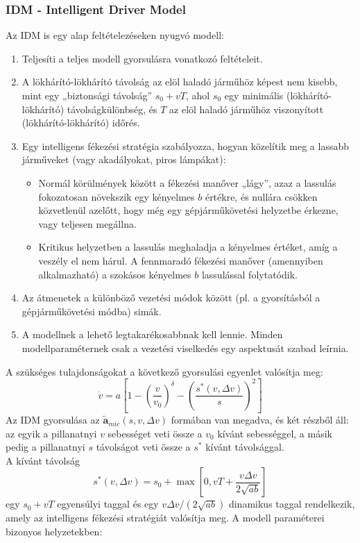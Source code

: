 \documentclass[14pt,a4paper]{extarticle}
\begin{document}
\subsubsection{IDM - Intelligent Driver Model}
Az IDM is egy alap feltételezéseken nyugvó modell:
\begin{enumerate}
	\item Teljesíti a teljes modell gyorsulásra vonatkozó feltételeit.
	\item A lökhárító-lökhárító távolság az elöl haladó járműhöz képest nem kisebb, mint egy „biztonsági távolság” $s_0 + vT$, ahol $s_0$ egy minimális (lökhárító-lökhárító) távolságkülönbség, és $T$ az elöl haladó járműhöz viszonyított (lökhárító-lökhárító) időrés.
	\item Egy intelligens fékezési stratégia szabályozza, hogyan közelítik meg a lassabb járműveket (vagy akadályokat, piros lámpákat):
	\begin{itemize}
		\item	Normál körülmények között a fékezési manőver „lágy”, azaz a lassulás fokozatosan növekszik egy kényelmes $b$ értékre, és nullára csökken közvetlenül azelőtt, hogy még egy  gépjárműkövetési helyzetbe érkezne, vagy teljesen megállna.
		\item Kritikus helyzetben a lassulás meghaladja a kényelmes értéket, amíg a veszély el nem hárul. A fennmaradó fékezési manőver (amennyiben alkalmazható) a szokásos kényelmes $b$ lassulással folytatódik.
	\end{itemize}
	\item Az átmenetek a különböző vezetési módok között (pl. a gyorsításból a gépjárműkövetési módba) simák.
	\item A modellnek a lehető legtakarékosabbnak kell lennie. Minden modellparaméternek csak a vezetési viselkedés egy aspektusát szabad leírnia.
\end{enumerate}
A szükséges tulajdonságokat a következő gyorsulási egyenlet valósítja meg:$$\dot{v} = a \left[1 - \left(\frac{v}{v_0}\right)^\delta - \left(\frac{s^*(v, \Delta v)}{s}\right)^2 \right]$$
Az IDM gyorsulása az $\mathbf{\tilde{a}}_{mic}(s, v, \Delta v)$ formában van megadva, és két részből áll: az egyik a pillanatnyi $v$ sebességet veti össze a ${v}_0$ kívánt sebességgel, a másik pedig a pillanatnyi $s$ távolságot veti össze a $s^*$ kívánt távolsággal.
\\
A kívánt távolság
$$s^*(v, \Delta v) = s_0 + \max \left[0, vT + \frac{v\Delta v}{2\sqrt{ab}}\right]$$
egy $s_0 + vT$ egyensúlyi taggal és egy $v\Delta v / (2\sqrt{ab})$ dinamikus taggal rendelkezik, amely az intelligens fékezési stratégiát valósítja meg. A modell paraméterei bizonyos helyzetekben:
\end{document}
